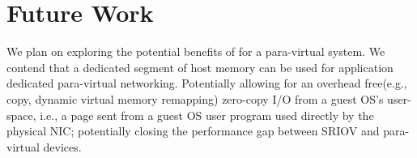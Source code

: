 
\section{Future Work}


We plan on exploring the potential benefits of \oursys for a para-virtual system. We contend that a dedicated segment of host memory can be used for application dedicated para-virtual networking. Potentially allowing for an overhead free(e.g., copy, dynamic virtual memory remapping) zero-copy I/O from a guest OS's user-space, i.e., a \oursys page sent from a guest OS user program used directly by the physical NIC; potentially closing the performance gap between SRIOV and para-virtual devices.



